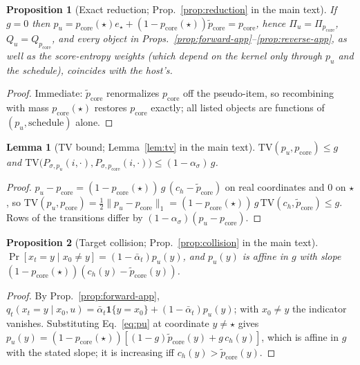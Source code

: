\documentclass[letterpaper]{article}
\newcommand{\pcore}{p_{\mathrm{core}}}
\newcommand{\pcorer}{\tilde{p}_{\mathrm{core}}}
\newcommand{\ch}{c_{h}}
\newcommand{\pu}{p_{u}}
\newcommand{\TV}{\mathrm{TV}}
\newtheorem{proposition}{Proposition}
\newtheorem{lemma}{Lemma}
\begin{document}
\begin{proposition}[Exact reduction; Prop.~\ref{prop:reduction} in the
main text]
\label{prop:reduction-app}
If $g=0$ then $\pu=\pcore(\star)e_\star
+(1-\pcore(\star))\pcorer=\pcore$, hence $\Pi_u=\Pi_{\pcore}$,
$Q_u=Q_{\pcore}$, and every object in
Props.~\ref{prop:forward-app}--\ref{prop:reverse-app}, as well as the
score-entropy weights (which depend on the kernel only through $\pu$
and the schedule), coincides with the host's.
\end{proposition}
\begin{proof}
Immediate: $\pcorer$ renormalizes $\pcore$ off the pseudo-item, so
recombining with mass $\pcore(\star)$ restores $\pcore$ exactly; all
listed objects are functions of $(\pu,\text{schedule})$ alone.
\end{proof}

\begin{lemma}[TV bound; Lemma~\ref{lem:tv} in the main text]
\label{lem:tv-app}
$\TV(\pu,\pcore)\le g$ and
$\TV\big(P_{\sigma,\pu}(i,\cdot),P_{\sigma,\pcore}(i,\cdot)\big)
\le(1-\alpha_\sigma)\,g$.
\end{lemma}
\begin{proof}
$\pu-\pcore=(1-\pcore(\star))\,g\,(\ch-\pcorer)$ on real coordinates
and $0$ on $\star$, so
$\TV(\pu,\pcore)=\tfrac12\|\pu-\pcore\|_1
=(1-\pcore(\star))\,g\,\TV(\ch,\pcorer)\le g$.
Rows of the transitions differ by $(1-\alpha_\sigma)(\pu-\pcore)$.
\end{proof}

\begin{proposition}[Target collision; Prop.~\ref{prop:collision} in
the main text]
\label{prop:collision-app}
$\Pr[x_t{=}y\mid x_0{\ne}y]=(1-\bar\alpha_t)\pu(y)$, and $\pu(y)$ is
affine in $g$ with slope
$(1-\pcore(\star))(\ch(y)-\pcorer(y))$.
\end{proposition}
\begin{proof}
By Prop.~\ref{prop:forward-app},
$q_t(x_t{=}y\mid x_0,u)=\bar\alpha_t\mathbf{1}\{y{=}x_0\}
+(1-\bar\alpha_t)\pu(y)$; with $x_0\ne y$ the indicator vanishes.
Substituting Eq.~\eqref{eq:pu} at coordinate $y\ne\star$ gives
$\pu(y)=(1-\pcore(\star))[(1-g)\pcorer(y)+g\,\ch(y)]$, which is affine
in $g$ with the stated slope; it is increasing iff
$\ch(y)>\pcorer(y)$.
\end{proof}
\end{document}
